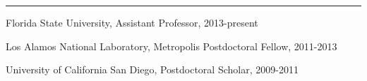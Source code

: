 
\rule[3pt]{398.5pt}{.1mm}

\noindent
Florida State University, Assistant Professor, \hfill 2013-present

\noindent
Los Alamos National Laboratory, Metropolis Postdoctoral Fellow, \hfill 2011-2013

\noindent
University of California San Diego, Postdoctoral Scholar, \hfill 2009-2011

\medskip
